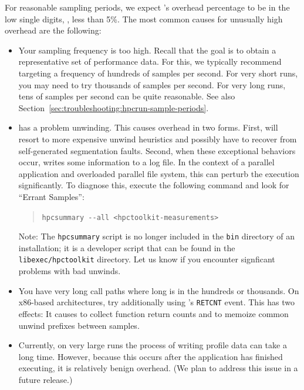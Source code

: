\documentclass[11pt,letterpaper]{report}
\begin{document}
For reasonable sampling periods, we expect \hpcrun{}'s overhead percentage to be in the low single digits, \eg{}, less than 5\%.
The most common causes for unusually high overhead are the following:
\begin{itemize}

\item Your sampling frequency is too high.
  Recall that the goal is to obtain a representative set of performance data.
  For this, we typically recommend targeting a frequency of hundreds of samples per second.
  For very short runs, you may need to try thousands of samples per second.
  For very long runs, tens of samples per second can be quite reasonable.
  See also Section~\ref{sec:troubleshooting:hpcrun-sample-periods}.

\item \hpcrun{} has a problem unwinding.
  This causes overhead in two forms.
  First, \hpcrun{} will resort to more expensive unwind heuristics and possibly have to recover from self-generated segmentation faults.
  Second, when these exceptional behaviors occur, \hpcrun{} writes some information to a log file.
  In the context of a parallel application and overloaded parallel file system, this can perturb the execution significantly.
  To diagnose this, execute the following command and look for ``Errant Samples'':
  \begin{quote}
  \verb|hpcsummary --all <hpctoolkit-measurements>|
  \end{quote}
  Note: The \verb|hpcsummary| script is no longer included in the \verb|bin| directory of an \HPCToolkit{} installation; 
  it is a developer script that can be found in the \verb|libexec/hpctoolkit| directory. 
  Let us know if you encounter signficant problems with bad unwinds.

\item You have very long call paths where long is in the hundreds or thousands.
  On x86-based architectures, try additionally using \hpcrun{}'s \texttt{RETCNT} event.
  This has two effects: It causes \hpcrun{} to collect function return counts and to memoize common unwind prefixes between samples.

\item Currently, on very large runs the process of writing profile data can take a long time.
  However, because this occurs after the application has finished executing, it is relatively benign overhead.
  (We plan to address this issue in a future release.)

\end{itemize}
\end{document}
